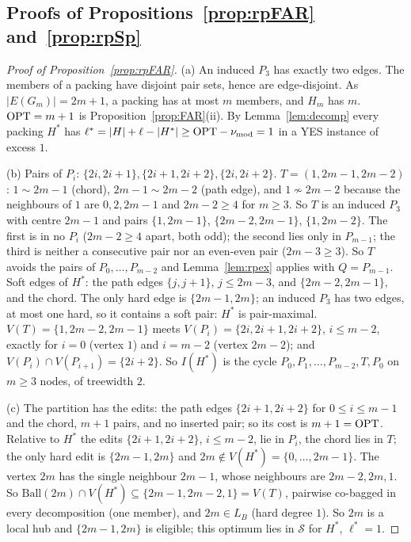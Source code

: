 \subsection{Proofs of Propositions~\ref{prop:rpFAR} and~\ref{prop:rpSp}}
\begin{proof}[Proof of Proposition~\ref{prop:rpFAR}]
(a) An induced $P_3$ has exactly two edges. The members of a packing have disjoint pair sets, hence are edge-disjoint. As $|E(G_m)|=2m+1$, a packing has at most $m$ members, and $H_m$ has $m$. $\mathrm{OPT}=m+1$ is Proposition~\ref{prop:FAR}(ii). By Lemma~\ref{lem:decomp} every packing $H^*$ has $\ell^*=|H|+\ell-|H^*|\ge\mathrm{OPT}-\nu_{\mathrm{mod}}=1$ in a YES instance of excess $1$.

(b) Pairs of $P_i$: $\{2i,2i+1\},\{2i+1,2i+2\},\{2i,2i+2\}$. $T=(1,2m-1,2m-2)$: $1\sim2m-1$ (chord), $2m-1\sim2m-2$ (path edge), and $1\not\sim2m-2$ because the neighbours of $1$ are $0,2,2m-1$ and $2m-2\ge4$ for $m\ge3$. So $T$ is an induced $P_3$ with centre $2m-1$ and pairs $\{1,2m-1\}$, $\{2m-2,2m-1\}$, $\{1,2m-2\}$. The first is in no $P_i$ ($2m-2\ge4$ apart, both odd); the second lies only in $P_{m-1}$; the third is neither a consecutive pair nor an even-even pair ($2m-3\ge3$). So $T$ avoids the pairs of $P_0,\dots,P_{m-2}$ and Lemma~\ref{lem:rpex} applies with $Q=P_{m-1}$. Soft edges of $H^*$: the path edges $\{j,j+1\}$, $j\le2m-3$, and $\{2m-2,2m-1\}$, and the chord. The only hard edge is $\{2m-1,2m\}$; an induced $P_3$ has two edges, at most one hard, so it contains a soft pair: $H^*$ is pair-maximal. $V(T)=\{1,2m-2,2m-1\}$ meets $V(P_i)=\{2i,2i+1,2i+2\}$, $i\le m-2$, exactly for $i=0$ (vertex $1$) and $i=m-2$ (vertex $2m-2$); and $V(P_i)\cap V(P_{i+1})=\{2i+2\}$. So $I(H^*)$ is the cycle $P_0,P_1,\dots,P_{m-2},T,P_0$ on $m\ge3$ nodes, of treewidth $2$.

(c) The partition has the edits: the path edges $\{2i+1,2i+2\}$ for $0\le i\le m-1$ and the chord, $m+1$ pairs, and no inserted pair; so its cost is $m+1=\mathrm{OPT}$. Relative to $H^*$ the edits $\{2i+1,2i+2\}$, $i\le m-2$, lie in $P_i$, the chord lies in $T$; the only hard edit is $\{2m-1,2m\}$ and $2m\notin V(H^*)=\{0,\dots,2m-1\}$. The vertex $2m$ has the single neighbour $2m-1$, whose neighbours are $2m-2,2m,1$. So $\mathrm{Ball}(2m)\cap V(H^*)\subseteq\{2m-1,2m-2,1\}=V(T)$, pairwise co-bagged in every decomposition (one member), and $2m\in L_B$ (hard degree $1$). So $2m$ is a local hub and $\{2m-1,2m\}$ is eligible; this optimum lies in $\mathcal S$ for $H^*$, $\ell^*=1$.
\end{proof}

